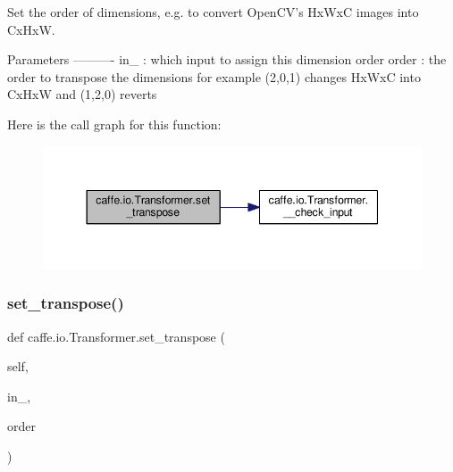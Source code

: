 \begin{DoxyVerb}Set the order of dimensions, e.g. to convert OpenCV's HxWxC images
into CxHxW.

Parameters
----------
in_ : which input to assign this dimension order
order : the order to transpose the dimensions
    for example (2,0,1) changes HxWxC into CxHxW and (1,2,0) reverts
\end{DoxyVerb}
 Here is the call graph for this function\+:
\nopagebreak
\begin{figure}[H]
\begin{center}
\leavevmode
\includegraphics[width=344pt]{classcaffe_1_1io_1_1_transformer_af0acba3b0fe23e7fe33228600b18279a_cgraph}
\end{center}
\end{figure}
\mbox{\label{classcaffe_1_1io_1_1_transformer_af0acba3b0fe23e7fe33228600b18279a}} 
\subsubsection{\texorpdfstring{set\+\_\+transpose()}{set\_transpose()}\hspace{0.1cm}{\footnotesize\ttfamily [2/2]}}
{\footnotesize\ttfamily def caffe.\+io.\+Transformer.\+set\+\_\+transpose (\begin{DoxyParamCaption}\item[{}]{self,  }\item[{}]{in\+\_\+,  }\item[{}]{order }\end{DoxyParamCaption})}

